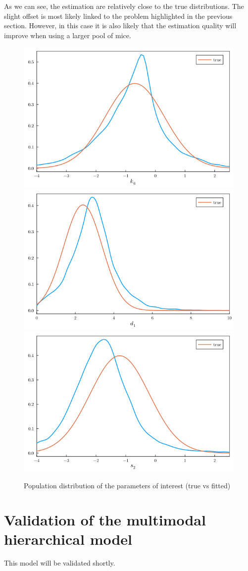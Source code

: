 \documentclass[11pt]{article}
\begin{document}
    As we can see, the estimation are relatively close to the true distributions. The slight offset is most likely linked to the problem highlighted in the previous section. However, in this case it is also likely that the estimation quality will improve when using a larger pool of mice.

    \begin{figure}[!h]
        \centering
        \includegraphics[scale=0.4]{k6_popu.png}
        \includegraphics[scale=0.4]{d1_popu.png}
        \includegraphics[scale=0.4]{s2_popu.png}
        \caption{Population distribution of the parameters of interest (true vs fitted)}
        \label{fig:pop_d1}
    \end{figure}

    \section{Validation of the multimodal hierarchical
        model}

    This model will be validated shortly.
\end{document}
